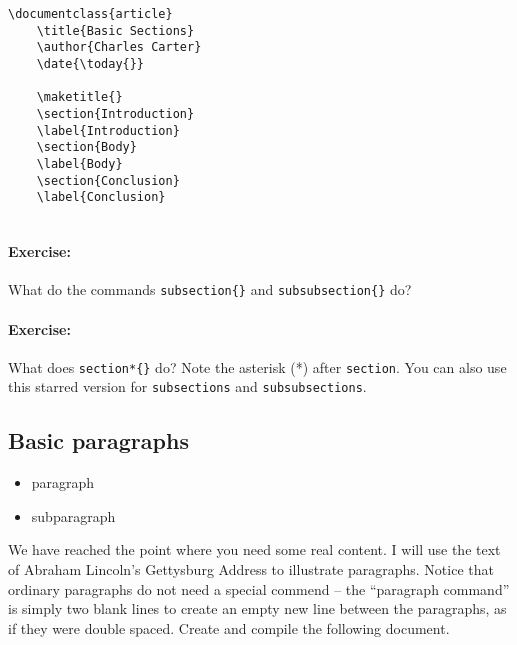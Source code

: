         \begin{verbatim}
\documentclass{article}
    \title{Basic Sections}
    \author{Charles Carter}
    \date{\today{}}
 
    \maketitle{}
    \section{Introduction}
    \label{Introduction}
    \section{Body}
    \label{Body}
    \section{Conclusion}
    \label{Conclusion}
    
        \end{verbatim}

        \paragraph{Exercise:}What do the commands \texttt{subsection\{\}} and \texttt{subsubsection\{\}} do?

        \paragraph{Exercise:}What does \texttt{section*\{\}} do? Note the asterisk (*) after \texttt{section}. You can also use this starred version for \texttt{subsections} and \texttt{subsubsections}.

        \subsection{Basic paragraphs}
        \label{Basic-paragraphs}
        
        \begin{framed}
            \begin{itemize}
                \item{paragraph}
                \item{subparagraph}
            \end{itemize}
        \end{framed}


        We have reached the point where you need some real content. I will use the text of Abraham Lincoln's Gettysburg Address to illustrate paragraphs. Notice that ordinary paragraphs do not need a special commend -- the ``paragraph command'' is simply two blank lines to create an empty new line between the paragraphs, as if they were double spaced. Create and compile the following document.

